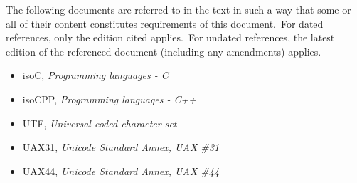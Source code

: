 
\p The following documents are referred to in the text in such a way that some
or all of their content constitutes requirements of this document.\ For dated
references, only the edition cited applies.\ For undated references, the latest
edition of the referenced document (including any amendments) applies.

\begin{itemize}
  \item \gls{isoC}, \textit{Programming languages - C}
  \item \gls{isoCPP}, \textit{Programming languages - C++}
  \item \gls{UTF}, \textit{Universal coded character set}
  \item \gls{UAX31}, \textit{Unicode Standard Annex, UAX \#31}
  \item \gls{UAX44}, \textit{Unicode Standard Annex, UAX \#44}
\end{itemize}
